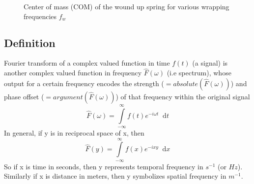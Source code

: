 \documentclass[11pt, a4paper]{article}
\newcommand{\diff}{\mathop{}\!\mathrm{d}}
\newcommand{\dx}{\diff x}
\newcommand{\dt}{\diff t}
\newcommand{\dint}[2]{\int \limits_{#1}^{#2}}  %
\newcommand{\intinfty}{\dint{-\infty}{\infty}}	%
\begin{document}
\begin{figure}
	\centering
	\hfill
	
	\caption{Center of mass (COM) of the wound up spring for various wrapping frequencies $f_{w}$}
	\label{fig:wound_up_spring_com_plots}
\end{figure}


\subsection{Definition}\label{sec:fourier_transform_def}  %
Fourier transform of a complex valued function in time $f(t)$ (a signal) is another complex valued function in frequency $\hat{F}(\omega)$ (i.e spectrum), whose output for a certain frequency encodes the strength ($=absolute(\hat{F}(\omega))$) and phase offset ($=argument(\hat{F}(\omega))$) of that frequency within the original signal \cite{herman2016fourieranalysis}
\begin{equation}\label{eq:ft_def}
	\boxed{
		\hat{F}(\omega) = \intinfty f(t)e^{-i\omega t} \dt
	}
\end{equation}
In general, if y is in reciprocal space of x, then
\begin{equation*}\label{eq:ft_def_general}
	\hat{F}(y) = \intinfty f(x)e^{-ixy} \dx
\end{equation*}
So if x is time in seconds, then y represents temporal frequency in $s^{-1}$ (or $Hz$). Similarly if x is distance in meters, then y symbolizes spatial frequency in $m^{-1}$.
\end{document}
